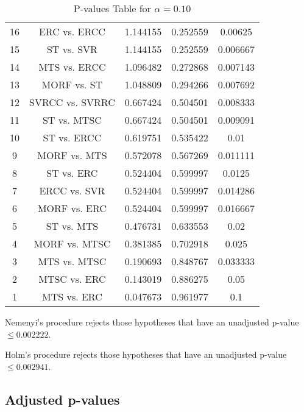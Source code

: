 \documentclass[a4paper,10pt]{article}
\begin{document}
\begin{landscape}
\begin{table}[!htp]
\begin{tabular}{ccccc}
16&ERC vs. ERCC&1.144155&0.252559&0.00625\\
15&ST vs. SVR&1.144155&0.252559&0.006667\\
14&MTS vs. ERCC&1.096482&0.272868&0.007143\\
13&MORF vs. ST&1.048809&0.294266&0.007692\\
12&SVRCC vs. SVRRC&0.667424&0.504501&0.008333\\
11&ST vs. MTSC&0.667424&0.504501&0.009091\\
10&ST vs. ERCC&0.619751&0.535422&0.01\\
9&MORF vs. MTS&0.572078&0.567269&0.011111\\
8&ST vs. ERC&0.524404&0.599997&0.0125\\
7&ERCC vs. SVR&0.524404&0.599997&0.014286\\
6&MORF vs. ERC&0.524404&0.599997&0.016667\\
5&ST vs. MTS&0.476731&0.633553&0.02\\
4&MORF vs. MTSC&0.381385&0.702918&0.025\\
3&MTS vs. MTSC&0.190693&0.848767&0.033333\\
2&MTSC vs. ERC&0.143019&0.886275&0.05\\
1&MTS vs. ERC&0.047673&0.961977&0.1\\
\hline
\end{tabular}
\caption{P-values Table for $\alpha=0.10$}
\end{table}Nemenyi's procedure rejects those hypotheses that have an unadjusted p-value $\le0.002222$.

Holm's procedure rejects those hypotheses that have an unadjusted p-value $\le0.002941$.

\pagebreak

\subsection{Adjusted p-values}


\end{landscape}
\end{document}
